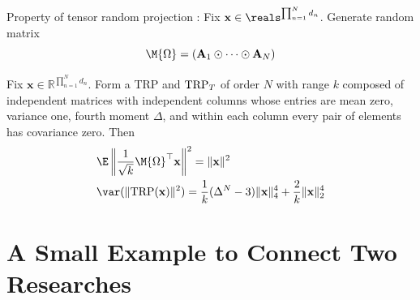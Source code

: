 \documentclass[handout,xcolor={usenames,dvipsnames}]{beamer}
\begin{document}
\begin{frame}{Property of tensor random projection}
:
Fix $\mathbf{x} \in \reals^{\prod_{n=1}^N d_n}$. Generate random matrix 
\[
\M{\Omega}= (\mathbf{A}_1 \odot \cdots \odot \mathbf{A}_N)
\]
\begin{thm}
	Fix $\mathbf{x} \in \mathbb{R}^{\prod_{n=1}^N d_n}$.
	Form a TRP and $\textup{TRP}_T$ of order $N$ with range $k$
	composed of independent matrices with independent columns
	whose entries are mean zero, variance one, fourth moment $\Delta$, and within each column every pair of elements has covariance zero.
	Then
\begin{equation}
\begin{aligned}
& \E \left\| \frac{1}{\sqrt{k}}\M{\Omega}^\top \mathbf{x} \right\|^2 = \|\mathbf{x}\|^2  \\
& \var(\|\textup{TRP}(\mathbf{x})\|^2) = \frac{1}{k}(\Delta^N-3)\|\mathbf{x}\|_4^4 + \frac{2}{k}\|\mathbf{x}\|_2^4 
\end{aligned}
\end{equation}
\end{thm}
\end{frame}



\section{A Small Example to Connect Two Researches}








\end{document}

